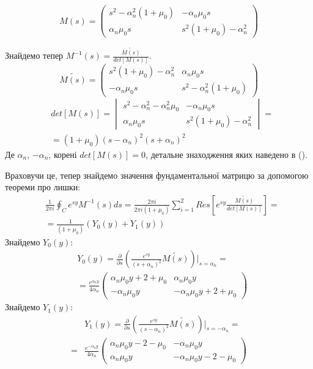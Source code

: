 \begin{equation}
    M(s) = \begin{pmatrix}
        s^2 -\alpha_n^2(1 + \mu_0) & -\alpha_n \mu_0 s \\
        \alpha_n \mu_0 s & s^2 (1 + \mu_0) -\alpha_n^2
     \end{pmatrix}
\end{equation}

Знайдемо тепер $M^{-1}(s) = \frac{\widetilde{M(s)}}{det[M(s)]}$.
\begin{equation}
    \widetilde{M(s)} = \begin{pmatrix}
        s^2 (1 + \mu_0) -\alpha_n^2 & \alpha_n \mu_0 s \\
        -\alpha_n \mu_0 s & s^2 -\alpha_n^2(1 + \mu_0)
     \end{pmatrix}
\end{equation}
\begin{align}
    &det[M(s)] = \begin{vmatrix}
        s^2 - \alpha_n^2 - \alpha_n^2\mu_0 & -\alpha_n \mu_0 s \\
        \alpha_n \mu_0 s & s^2 (1 + \mu_0) -\alpha_n^2
     \end{vmatrix} = \nonumber \\
    &=(1+\mu_0)(s - \alpha_n)^2(s + \alpha_n)^2
\end{align}
Де $\alpha_n$, $-\alpha_n$, корені $det[M(s)]=0$, детальне знаходження яких наведено в ().

Враховучи це, тепер знайдемо значення фундаментальної матрицю за допомогою теореми про лишки:
\begin{align*}
    &\frac{1}{2\pi i} \oint_C e^{sy} M^{-1}(s)ds = \frac{2 \pi i}{2 \pi i (1 + \mu_0)} \sum_{i=1}^{2} Res\left[ e^{sy} \frac{\widetilde{M(s)}}{det[M(s)]} \right] = \\
    & = \frac{1}{(1 + \mu_0)} \left(Y_0(y) + Y_1(y) \right)
\end{align*}
Знайдемо $Y_0(y)$:
\begin{align}
    &Y_0(y) =  \frac{\partial}{\partial s} \left( \frac{e^{sy}}{(s+\alpha_n)^2} \widetilde{M(s)} \right) \Big|_{s=\alpha_n} = \nonumber \\
    &=\frac{e^{\alpha_n y}}{4\alpha_n} \begin{pmatrix}
    \alpha_n \mu_0 y + 2 + \mu_0 & \alpha_n \mu_0 y \\
    -\alpha_n \mu_0 y & -\alpha_n \mu_0 y + 2 + \mu_0
    \end{pmatrix}
\end{align}
Знайдемо $Y_1(y)$:
\begin{align}
    &Y_1(y) = \frac{\partial}{\partial s} \left(\frac{e^{sy}}{(s-\alpha_n)^2} \widetilde{M(s)} \right) \Big|_{s=-\alpha_n} = \nonumber \\
    =&\frac{e^{-\alpha_n y}}{4\alpha_n} \begin{pmatrix}
    \alpha_n \mu_0 y - 2 - \mu_0 & -\alpha_n \mu_0 y \\
    \alpha_n \mu_0 y & -\alpha_n \mu_0 y - 2 - \mu_0
    \end{pmatrix}
\end{align}

